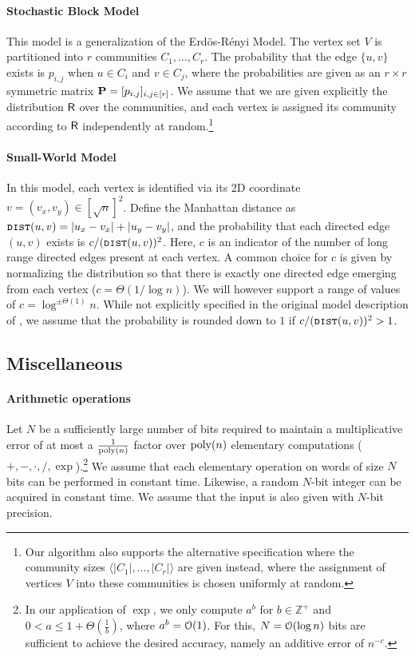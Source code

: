 \paragraph*{Stochastic Block Model}
This model is a generalization of the Erd\"{o}s-R\'{e}nyi Model. The vertex set $V$ is partitioned into $r$ communities $C_1, \ldots, C_r$. The probability that the edge $\{u,v\}$ exists is $p_{i,j}$ when $u\in C_i$ and $v\in C_j$, where the probabilities are given as an $r\times r$ symmetric matrix $\mathbf{P} = [p_{i,j}]_{i,j \in [r]}$.
We assume that we are given explicitly the distribution $\mathsf{R}$ over the communities, and
each vertex is assigned its community according to $\mathsf{R}$ independently at random.\footnote{Our algorithm also supports the alternative specification where the community sizes $\langle |C_1|, \ldots, |C_r|\rangle$ are given instead, where the assignment of vertices $V$ into these communities is chosen uniformly at random.}

\paragraph*{Small-World Model}
In this model, each vertex is identified via its 2D coordinate $v = (v_x, v_y) \in [\sqrt{n}]^2$. Define the Manhattan distance as $\texttt{\textsc{dist}}(u,v)=|u_x-v_x|+|u_y-v_y|$, and the probability that each directed edge $(u,v)$ exists is $c/(\texttt{\textsc{dist}}(u,v))^{2}$. Here, $c$ is an indicator of the number of long range directed edges present at each vertex. A common choice for $c$ is given by normalizing the distribution so that there is exactly one directed edge emerging from each vertex ($c = \Theta(1/\log n)$).
We will however support a range of values of $c=\log^{\pm\Theta(1)}n$.
While not explicitly specified in the original model description of \cite{kleinberg}, we assume that the probability is rounded down to $1$ if $c/(\texttt{\textsc{dist}}(u,v))^{2} > 1$.


\subsection{Miscellaneous}

\paragraph*{Arithmetic operations} Let $N$ be a sufficiently large number of bits required to maintain a multiplicative error of at most a $\frac{1}{\mathrm{poly}(n)}$ factor over $\mathrm{poly}(n)$ elementary computations ($+, -, \cdot, /, \exp$).\footnote{In our application of $\exp$, we only compute $a^b$ for $b \in \mathbb{Z}^+$ and $0 < a \leq 1+\Theta(\frac{1}{b})$, where $a^b = \Bo(1)$. For this, $N=\Bo(\log n)$ bits are sufficient to achieve the desired accuracy, namely an additive error of $n^{-c}$.} We assume that each elementary operation on words of size $N$ bits can be performed in constant time. Likewise, a random $N$-bit integer can be acquired in constant time. We assume that the input is also given with $N$-bit precision. %

